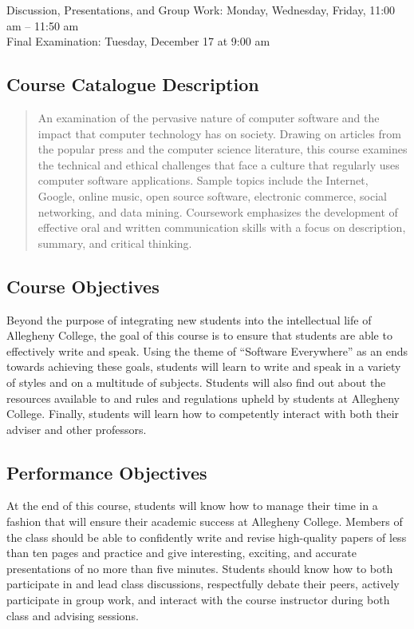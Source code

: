 Discussion, Presentations, and Group Work: Monday, Wednesday, Friday, 11:00 am -- 11:50 am \\
Final Examination: Tuesday, December 17 at 9:00 am

\subsection*{Course Catalogue Description}

\begin{quote}

An examination of the pervasive nature of computer software and the impact that computer technology has on society.
Drawing on articles from the popular press and the computer science literature, this course examines the technical and
ethical challenges that face a culture that regularly uses computer software applications. Sample topics include the
Internet, Google, online music, open source software, electronic commerce, social networking, and data mining.
Coursework emphasizes the development of effective oral and written communication skills with a focus on description,
summary, and critical thinking.

\end{quote}

\subsection*{Course Objectives}

Beyond the purpose of integrating new students into the intellectual life of Allegheny College, the goal of this course
is to ensure that students are able to effectively write and speak.  Using the theme of ``Software Everywhere'' as an
ends towards achieving these goals, students will learn to write and speak in a variety of styles and on a multitude of
subjects.  Students will also find out about the resources available to and rules and regulations upheld by students at
Allegheny College.  Finally, students will learn how to competently interact with both their adviser and other
professors.

\subsection*{Performance Objectives}

At the end of this course, students will know how to manage their time in a fashion that will ensure their academic
success at Allegheny College.  Members of the class should be able to confidently write and revise high-quality papers
of less than ten pages and practice and give interesting, exciting, and accurate presentations of no more than five
minutes.  Students should know how to both participate in and lead class discussions, respectfully debate their peers,
actively participate in group work, and interact with the course instructor during both class and advising sessions.


